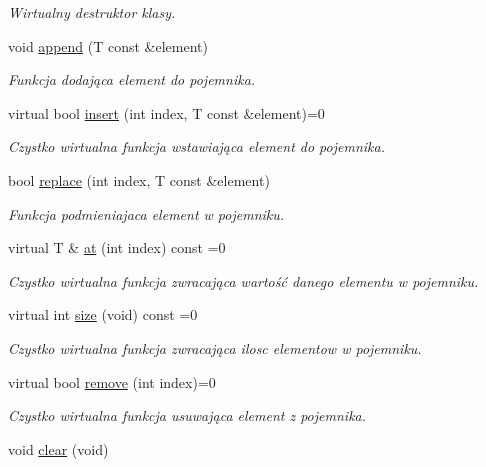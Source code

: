 \begin{DoxyCompactItemize}
\begin{DoxyCompactList}\small\item\em \-Wirtualny destruktor klasy. \end{DoxyCompactList}\item 
void \hyperlink{classaghContainer_ac3769208c1661b00e77993c84a39ca62}{append} (\-T const \&element)
\begin{DoxyCompactList}\small\item\em \-Funkcja dodająca element do pojemnika. \end{DoxyCompactList}\item 
virtual bool \hyperlink{classaghContainer_a251a27a833adec0ba54e7a59e9c0127d}{insert} (int index, \-T const \&element)=0
\begin{DoxyCompactList}\small\item\em \-Czystko wirtualna funkcja wstawiająca element do pojemnika. \end{DoxyCompactList}\item 
bool \hyperlink{classaghContainer_a1c11721e8af3a9b059f932a4f3de4a24}{replace} (int index, \-T const \&element)
\begin{DoxyCompactList}\small\item\em \-Funkcja podmieniajaca element w pojemniku. \end{DoxyCompactList}\item 
virtual \-T \& \hyperlink{classaghContainer_ac4f8b1f2109bd9439d491c8c02b27d66}{at} (int index) const =0
\begin{DoxyCompactList}\small\item\em \-Czystko wirtualna funkcja zwracająca wartość danego elementu w pojemniku. \end{DoxyCompactList}\item 
virtual int \hyperlink{classaghContainer_af33c330cf9c679612f6409f07eeb93b9}{size} (void) const =0
\begin{DoxyCompactList}\small\item\em \-Czystko wirtualna funkcja zwracająca ilosc elementow w pojemniku. \end{DoxyCompactList}\item 
virtual bool \hyperlink{classaghContainer_a6c987e618b15c4866334eebd98f83b0f}{remove} (int index)=0
\begin{DoxyCompactList}\small\item\em \-Czystko wirtualna funkcja usuwająca element z pojemnika. \end{DoxyCompactList}\item 
void \hyperlink{classaghContainer_a8d66192d4c77f45b2c0909c52a3f192b}{clear} (void)

\end{DoxyCompactItemize}
